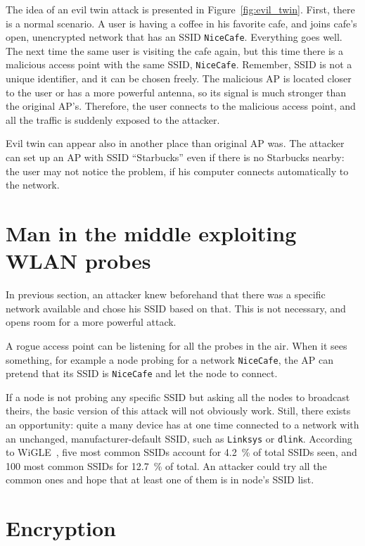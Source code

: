 \documentclass[12pt,a4paper,oneside,pdftex]{report}
\begin{document}
The idea of an evil twin attack is presented in Figure~\ref{fig:evil_twin}. First, there is a normal scenario. A user is having a coffee in his favorite cafe, and joins cafe's open, unencrypted network that has an SSID \texttt{NiceCafe}. Everything goes well. The next time the same user is visiting the cafe again, but this time there is a malicious access point with the same SSID, \texttt{NiceCafe}. Remember, SSID is not a unique identifier, and it can be chosen freely. The malicious AP is located closer to the user or has a more powerful antenna, so its signal is much stronger than the original AP's. Therefore, the user connects to the malicious access point, and all the traffic is suddenly exposed to the attacker.

Evil twin can appear also in another place than original AP was. The attacker can set up an AP with SSID ``Starbucks'' even if there is no Starbucks nearby: the user may not notice the problem, if his computer connects automatically to the network.

\section{Man in the middle exploiting WLAN probes}
\label{sec:mitm_probes}

In previous section, an attacker knew beforehand that there was a specific network available and chose his SSID based on that. This is not necessary, and opens room for a more powerful attack.

A rogue access point can be listening for all the probes in the air. When it sees something, for example a node probing for a network \texttt{NiceCafe}, the AP can pretend that its SSID is \texttt{NiceCafe} and let the node to connect.

If a node is not probing any specific SSID but asking all the nodes to broadcast theirs, the basic version of this attack will not obviously work. Still, there exists an opportunity: quite a many device has at one time connected to a network with an unchanged, manufacturer-default SSID, such as \texttt{Linksys} or \texttt{dlink}. According to WiGLE~\cite{wigle}, five most common SSIDs account for 4.2~\% of total SSIDs seen, and 100 most common SSIDs for 12.7~\% of total. An attacker could try all the common ones and hope that at least one of them is in node's SSID list.

\section{Encryption}
\label{sec:attack_encryption}
\end{document}
